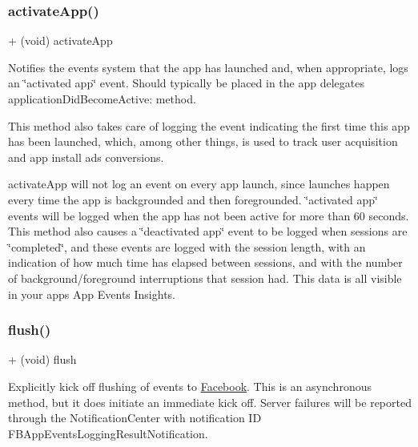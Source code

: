 \subsubsection{\texorpdfstring{activate\+App()}{activateApp()}\hspace{0.1cm}{\footnotesize\ttfamily [5/5]}}
{\footnotesize\ttfamily + (void) activate\+App \begin{DoxyParamCaption}{ }\end{DoxyParamCaption}}

Notifies the events system that the app has launched and, when appropriate, logs an \char`\"{}activated app\char`\"{} event. Should typically be placed in the app delegates\textquotesingle{} {\ttfamily application\+Did\+Become\+Active\+:} method.

This method also takes care of logging the event indicating the first time this app has been launched, which, among other things, is used to track user acquisition and app install ads conversions.

{\ttfamily activate\+App} will not log an event on every app launch, since launches happen every time the app is backgrounded and then foregrounded. \char`\"{}activated app\char`\"{} events will be logged when the app has not been active for more than 60 seconds. This method also causes a \char`\"{}deactivated app\char`\"{} event to be logged when sessions are \char`\"{}completed\char`\"{}, and these events are logged with the session length, with an indication of how much time has elapsed between sessions, and with the number of background/foreground interruptions that session had. This data is all visible in your app\textquotesingle{}s App Events Insights. \mbox{\label{interfaceFBAppEvents_a0475c0b929152f9be2b7428312382747}} 
\subsubsection{\texorpdfstring{flush()}{flush()}\hspace{0.1cm}{\footnotesize\ttfamily [1/5]}}
{\footnotesize\ttfamily + (void) flush \begin{DoxyParamCaption}{ }\end{DoxyParamCaption}}

Explicitly kick off flushing of events to \hyperlink{interfaceFacebook}{Facebook}. This is an asynchronous method, but it does initiate an immediate kick off. Server failures will be reported through the Notification\+Center with notification ID {\ttfamily F\+B\+App\+Events\+Logging\+Result\+Notification}. \mbox{\label{interfaceFBAppEvents_a0475c0b929152f9be2b7428312382747}} 
